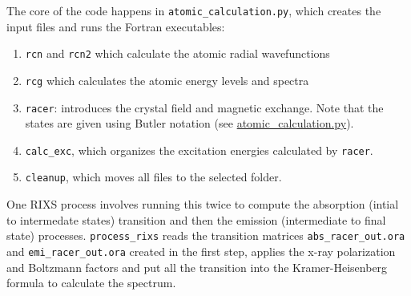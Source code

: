 \documentclass[aps,onecolumn, notitlepage, longbibliography]{revtex4-1}
\begin{document}
The core of the code happens in \texttt{atomic\_calculation.py}, which creates the input files and runs the Fortran executables:
\begin{enumerate}
\item \texttt{rcn} and \texttt{rcn2} which calculate the atomic radial wavefunctions
\item \texttt{rcg} which calculates the atomic energy levels and spectra
\item \texttt{racer}: introduces the crystal field and magnetic exchange. Note that the
states are given using Butler notation (see \href{https://github.com/gfabbris/multiplety/blob/master/multiplety/atomic\_calculation.py}{atomic\_calculation.py}).
\item \texttt{calc\_exc}, which organizes the excitation energies calculated by \texttt{racer}.
\item \texttt{cleanup}, which moves all files to the selected folder.
\end{enumerate}

One RIXS process involves running this twice to compute the absorption (intial to intermedate states) transition and then the emission (intermediate to final state) processes. \texttt{process\_rixs} reads the transition matrices \texttt{abs\_racer\_out.ora} and \texttt{emi\_racer\_out.ora} created in the first step, applies the x-ray polarization and Boltzmann factors and put all the transition into the Kramer-Heisenberg formula to calculate the spectrum. 


\end{document}
